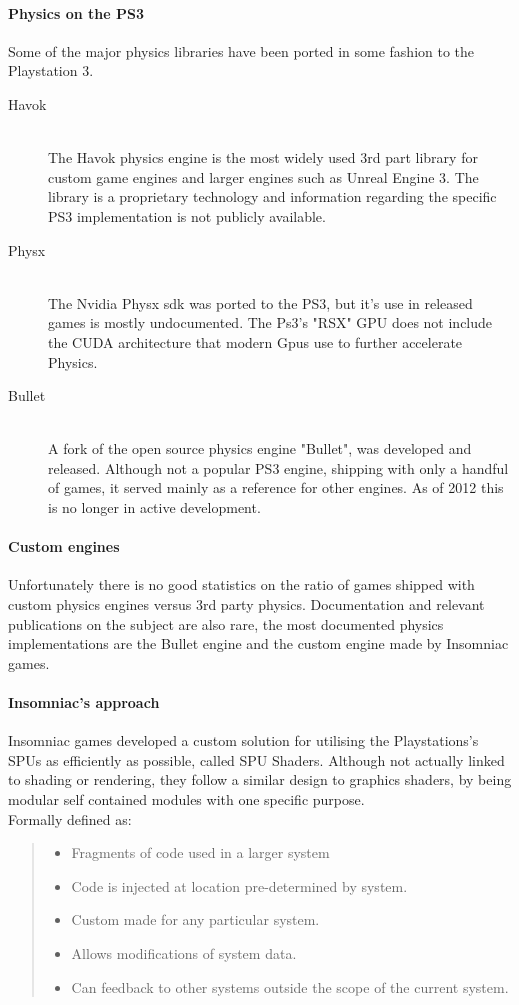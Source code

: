 \documentclass[conference]{acmsiggraph}
\begin{document}
\paragraph{Physics on the PS3}
Some of the major physics libraries have been ported in some fashion to the Playstation 3.
\begin{description}
  \item[Havok] \hfill \\
   The Havok physics engine is the most widely used 3rd part library for custom game engines and larger engines such as Unreal Engine 3. The library is a proprietary  technology and information regarding the specific PS3 implementation is not publicly available.
  \item[Physx] \hfill \\
  The Nvidia Physx sdk was ported to the PS3, but it's use in released games is mostly undocumented. The Ps3's "RSX" GPU does not include the CUDA architecture that modern Gpus use to further accelerate Physics.
  \item[Bullet] \hfill \\
  A fork of the open source physics engine "Bullet", was developed and released. Although not a popular PS3 engine, shipping with only a handful of games, it served mainly as a reference for other engines. As of 2012 this is no longer in active development.
\end{description}

\paragraph{Custom engines}
Unfortunately there is no good statistics on the ratio of games shipped with custom physics engines versus 3rd party physics. 
Documentation and relevant publications on the subject are also rare, the most documented physics implementations are the Bullet engine and the custom engine made by Insomniac games.

\paragraph{Insomniac's approach}

Insomniac games developed a custom solution for utilising the Playstations's SPUs as efficiently as possible, called SPU Shaders. Although not actually linked to shading or rendering, they follow a similar design to graphics shaders, by being modular self contained modules with one specific purpose.\\
Formally defined as:
\begin{quote}
\begin{itemize}
  \item Fragments of code used in a larger system
  \item Code is injected at location pre-determined by
system.
  \item Custom made for any particular system.
  \item Allows modifications of system data.
  \item Can feedback to other systems outside the scope of the current system.
\end{itemize}
\cite{spushaders}
\end{quote}
\end{document}
